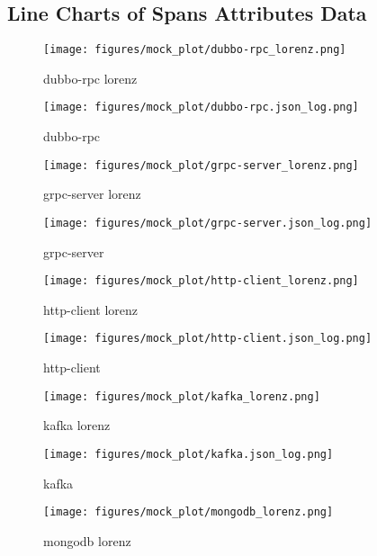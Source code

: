 
\newpage
\begin{appendices}
\section{Line Charts of Spans Attributes Data}

\begin{figure}[htp]
    \centering
    \texttt{[image: figures/mock\_plot/dubbo-rpc\_lorenz.png]}
    \caption{dubbo-rpc lorenz}
\end{figure}

\begin{figure}[htp]
    \centering
    \texttt{[image: figures/mock\_plot/dubbo-rpc.json\_log.png]}
    \caption{dubbo-rpc}
\end{figure}

\begin{figure}[htp]
    \centering
    \texttt{[image: figures/mock\_plot/grpc-server\_lorenz.png]}
    \caption{grpc-server lorenz}
\end{figure}

\begin{figure}[htp]
    \centering
    \texttt{[image: figures/mock\_plot/grpc-server.json\_log.png]}
    \caption{grpc-server}
\end{figure}

\begin{figure}[htp]
    \centering
    \texttt{[image: figures/mock\_plot/http-client\_lorenz.png]}
    \caption{http-client lorenz}
\end{figure}

\begin{figure}[htp]
    \centering
    \texttt{[image: figures/mock\_plot/http-client.json\_log.png]}
    \caption{http-client}
\end{figure}

\begin{figure}[htp]
    \centering
    \texttt{[image: figures/mock\_plot/kafka\_lorenz.png]}
    \caption{kafka lorenz}
\end{figure}

\begin{figure}[htp]
    \centering
    \texttt{[image: figures/mock\_plot/kafka.json\_log.png]}
    \caption{kafka}
\end{figure}

\begin{figure}[htp]
    \centering
    \texttt{[image: figures/mock\_plot/mongodb\_lorenz.png]}
    \caption{mongodb lorenz}
\end{figure}


\end{appendices}
